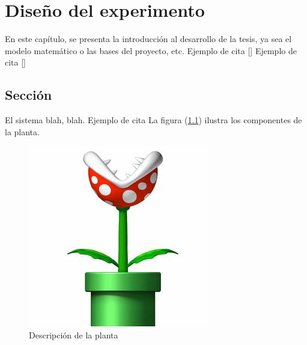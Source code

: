 

\chapter{Diseño del experimento}
En este capítulo, se presenta la introducción al desarrollo de la tesis, ya sea el modelo matemático o las bases del proyecto, etc.
Ejemplo de cita  [\citet{latex}]
Ejemplo de cita [\citeauthor{RR73}]





\section{Sección}
El sistema blah, blah. Ejemplo de cita \citep{texbook}
La figura (\ref{planta})                     %
 ilustra los componentes de la planta.

\begin{figure}
  \centering
    \includegraphics[scale=0.5]{Capitulo3/figs/planta.jpg}      %
  \caption{Descripción de la planta}            %
  \label{planta}                            %
\end{figure}




